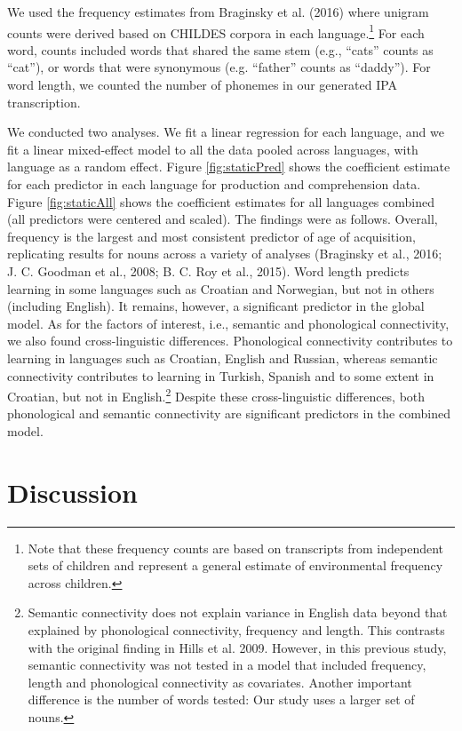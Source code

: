 \documentclass[english,floatsintext,man]{apa6}
\theoremstyle{definition}
\theoremstyle{definition}
\theoremstyle{definition}
\theoremstyle{remark}
\begin{document}
We used the frequency estimates from Braginsky et al. (2016) where
unigram counts were derived based on CHILDES corpora in each
language.\footnote{Note that these frequency counts are based on transcripts from independent sets of children and represent a general estimate of environmental frequency across children.}
For each word, counts included words that shared the same stem (e.g.,
\enquote{cats} counts as \enquote{cat}), or words that were synonymous
(e.g. \enquote{father} counts as \enquote{daddy}). For word length, we
counted the number of phonemes in our generated IPA transcription.

We conducted two analyses. We fit a linear regression for each language,
and we fit a linear mixed-effect model to all the data pooled across
languages, with language as a random effect. Figure \ref{fig:staticPred}
shows the coefficient estimate for each predictor in each language for
production and comprehension data. Figure \ref{fig:staticAll} shows the
coefficient estimates for all languages combined (all predictors were
centered and scaled). The findings were as follows. Overall, frequency
is the largest and most consistent predictor of age of acquisition,
replicating results for nouns across a variety of analyses (Braginsky et
al., 2016; J. C. Goodman et al., 2008; B. C. Roy et al., 2015). Word
length predicts learning in some languages such as Croatian and
Norwegian, but not in others (including English). It remains, however, a
significant predictor in the global model. As for the factors of
interest, i.e., semantic and phonological connectivity, we also found
cross-linguistic differences. Phonological connectivity contributes to
learning in languages such as Croatian, English and Russian, whereas
semantic connectivity contributes to learning in Turkish, Spanish and to
some extent in Croatian, but not in
English.\footnote{Semantic connectivity does not explain variance in English data beyond that explained by phonological connectivity, frequency and length. This contrasts with the original finding in Hills et al. 2009. However, in this previous study, semantic connectivity was not tested in a model that included frequency, length and phonological connectivity as covariates. Another important difference is the number of words tested: Our study uses a larger set of nouns.}
Despite these cross-linguistic differences, both phonological and
semantic connectivity are significant predictors in the combined model.

\section{Discussion}\label{discussion}
\end{document}
